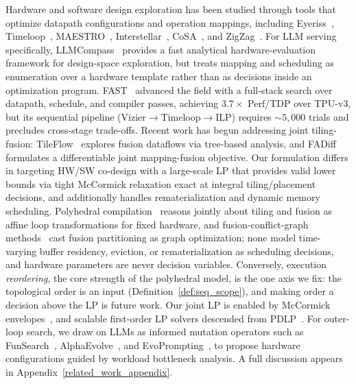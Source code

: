 Hardware and software design exploration has been studied through tools that optimize datapath configurations and operation mappings, including
Eyeriss~\citep{chen2019eyerissv2flexibleaccelerator},
Timeloop~\citep{timeloop},
MAESTRO~\citep{kwon2020understandingreuseperformancehardware},
Interstellar~\citep{yang_interstellar},
CoSA~\citep{huang2021cosaschedulingconstrainedoptimization},
and ZigZag~\citep{mei2021zigzag}.
For LLM serving specifically, LLMCompass~\citep{zhang2024llmcompass} provides a fast analytical hardware-evaluation framework for design-space exploration, but treats mapping and scheduling as enumeration over a hardware template rather than as decisions inside an optimization program.
FAST~\citep{zhang_fast} advanced the field with a full-stack search over datapath, schedule, and compiler passes, achieving $3.7\times$ Perf/TDP over TPU-v3, but its sequential pipeline (Vizier$\to$Timeloop$\to$ILP) requires ${\sim}5{,}000$ trials and precludes cross-stage trade-offs.
Recent work has begun addressing joint tiling-fusion:
TileFlow~\citep{zheng2023tileflow} explores fusion dataflows via tree-based analysis, and FADiff~\citep{jia2025fadifffusionawaredifferentiableoptimization} formulates a differentiable joint mapping-fusion objective. Our formulation differs in targeting HW/SW co-design with a large-scale LP that provides valid lower bounds via tight McCormick relaxation exact at integral tiling/placement decisions, and additionally handles rematerialization and dynamic memory scheduling.
Polyhedral compilation~\citep{feautrier1992affine,bondhugula2008pluto,baghdadi2019tiramisu} reasons jointly about tiling and fusion as affine loop transformations for fixed hardware, and fusion-conflict-graph methods~\citep{acharya2020fusion} cast fusion partitioning as graph optimization; none model time-varying buffer residency, eviction, or rematerialization as scheduling decisions, and hardware parameters are never decision variables. Conversely, execution \emph{reordering}, the core strength of the polyhedral model, is the one axis we fix: the topological order is an input (Definition~\ref{def:seq_scope}), and making order a decision above the LP is future work.
Our joint LP is enabled by McCormick envelopes~\citep{mccormick1976computability}, and scalable first-order LP solvers descended from PDLP~\citep{applegate2022practicallargescalelinearprogramming}. For outer-loop search, we draw on LLMs as informed mutation operators such as FunSearch~\citep{romera2024mathematical}, AlphaEvolve~\citep{novikov2025alphaevolvecodingagentscientific}, and EvoPrompting~\citep{chen2023evopromptinglanguagemodelscodelevel}, to propose hardware configurations guided by workload bottleneck analysis. A full discussion appears in Appendix~\ref{related_work_appendix}.
